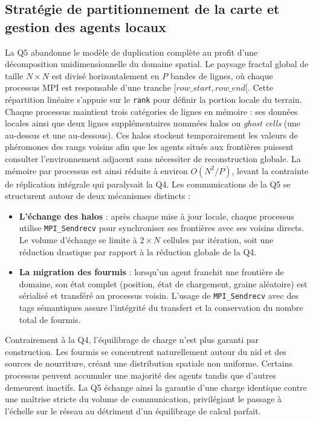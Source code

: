 \documentclass[11pt,a4paper]{article}
\begin{document}
\subsection{Stratégie de partitionnement de la carte et gestion des agents locaux}
La Q5 abandonne le modèle de duplication complète au profit d'une décomposition unidimensionnelle du domaine spatial. Le paysage fractal global de taille $N \times N$ est divisé horizontalement en $P$ bandes de lignes, où chaque processus MPI est responsable d'une tranche $[row\_start, row\_end[$. Cette répartition linéaire s'appuie sur le \texttt{rank} pour définir la portion locale du terrain.
Chaque processus maintient trois catégories de lignes en mémoire : ses données locales ainsi que deux lignes supplémentaires nommées halos ou \emph{ghost cells} (une au-dessus et une au-dessous). Ces halos stockent temporairement les valeurs de phéromones des rangs voisins afin que les agents situés aux frontières puissent consulter l'environnement adjacent sans nécessiter de reconstruction globale. La mémoire par processus est ainsi réduite à environ $O(N^2 / P)$, levant la contrainte de réplication intégrale qui paralysait la Q4.
Les communications de la Q5 se structurent autour de deux mécanismes distincts :
\begin{itemize}[leftmargin=1.2em]
  \item \textbf{L'échange des halos} : après chaque mise à jour locale, chaque processus utilise \texttt{MPI\_Sendrecv} pour synchroniser ses frontières avec ses voisins directs. Le volume d'échange se limite à $2 \times N$ cellules par itération, soit une réduction drastique par rapport à la réduction globale de la Q4.
  \item \textbf{La migration des fourmis} : lorsqu'un agent franchit une frontière de domaine, son état complet (position, état de chargement, graine aléatoire) est sérialisé et transféré au processus voisin. L'usage de \texttt{MPI\_Sendrecv} avec des tags sémantiques assure l'intégrité du transfert et la conservation du nombre total de fourmis.
\end{itemize}

Contrairement à la Q4, l'équilibrage de charge n'est plus garanti par construction. Les fourmis se concentrent naturellement autour du nid et des sources de nourriture, créant une distribution spatiale non uniforme. Certains processus peuvent accumuler une majorité des agents tandis que d'autres demeurent inactifs. La Q5 échange ainsi la garantie d'une charge identique contre une maîtrise stricte du volume de communication, privilégiant le passage à l'échelle sur le réseau au détriment d'un équilibrage de calcul parfait.
\end{document}
